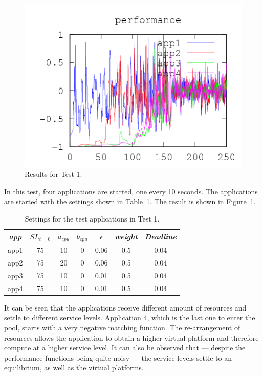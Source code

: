 \documentclass[nobiblatex]{LTHthesis}
\begin{document}
\begin{figure}[th]
\begin{minipage}{0.49\textwidth}
  \includegraphics[width=\textwidth]{"tools/plot/logs/test1/f"}
  \end{minipage}
\caption{Results for Test 1.}
\label{fig:test1}
\end{figure}

In this test, four applications are started, one every 10 seconds. 
The applications are started with the settings shown in 
Table~\ref{tab:settings_test1}. The result is shown in 
Figure~\ref{fig:test1}. 

\begin{table}[h!]
  \centering
  \begin{tabular}{|c|c|c|c|c|c|c|}
  \hline 
   \emph{app} & $SL_{t=0}$ & \textbf{$a_{cpu}$} & 
   \textbf{$b_{cpu}$} & \textbf{$\epsilon$} & \emph{weight} & 
   \emph{Deadline} \\ \hline
  app1 & 75 & 10 & 0 & 0.06 & 0.5 &0.04  \\ \hline
  app2 & 75 & 20 & 0 & 0.06 & 0.5 &0.04  \\ \hline
  app3 & 75 & 10 & 0 & 0.01 & 0.5 &0.04  \\ \hline
  app4 & 75 & 10 & 0 & 0.01 & 0.5 &0.04  \\ \hline        
  \end{tabular}
  \caption{Settings for the test applications in Test 1.}
  \label{tab:settings_test1}
\end{table}

It can be seen that the applications receive different amount of resources
and settle to different service levels. Application 4, which is the last
one to enter the pool, starts with a very negative matching function. The
re-arrangement of resources allows the application to obtain a higher virtual
platform and therefore compute at a higher service level. It can also be
observed that --- despite the performance functions being quite noisy --- the
service levels settle to an equilibrium, as well as the virtual platforms.
\end{document}
